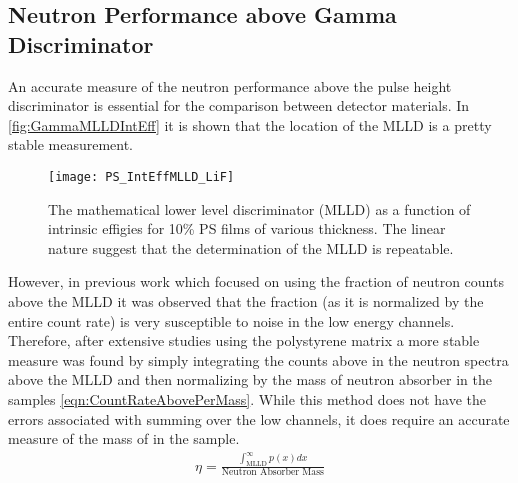 \documentclass[draftcls,onecolumn]{IEEEtran}
\begin{document}
\subsection{Neutron Performance above Gamma Discriminator}
An accurate measure of the neutron performance above the pulse height discriminator is essential for the comparison between detector materials.
In \autoref{fig:GammaMLLDIntEff} it is shown that the location of the MLLD is a pretty stable measurement.
\begin{figure}
  \centering
  \texttt{[image: PS\_IntEffMLLD\_LiF]}
  \caption[Stability of Lower Level Discriminator]{The mathematical lower level discriminator (MLLD) as a function of intrinsic effigies for 10\% PS films of various thickness. The linear nature suggest that the determination of the MLLD is repeatable.}
  \label{fig:GammaMLLDIntEff}
\end{figure}
However, in previous work which focused on using the fraction of neutron counts above the MLLD it was observed that the fraction (as it is normalized by the entire count rate) is very susceptible to noise in the low energy channels.
Therefore, after extensive studies using the polystyrene matrix a more stable measure was found by simply integrating the counts above in the neutron spectra above the MLLD and then normalizing by the mass of neutron absorber in the samples \autoref{eqn:CountRateAbovePerMass}.
While this method does not have the errors associated with summing over the low channels, it does require an accurate measure of the mass of  in the sample.
\begin{align}
\label{eqn:CountRateAbovePerMass}
\eta = \frac{\int_{\text{MLLD}}^\infty p(x)dx}{\text{Neutron Absorber Mass}}
\end{align}
\end{document}

